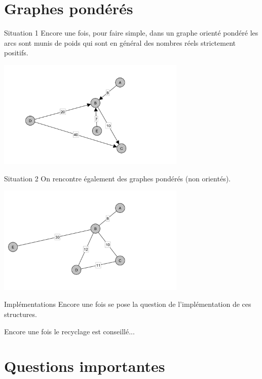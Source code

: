 \documentclass[10pt]{beamer}
\begin{document}
\section{Graphes pondérés}

\begin{frame}{Situation 1}
Encore une fois, pour faire simple, dans un \alert{graphe orienté pondéré} les arcs sont munis de poids qui sont en général des nombres réels strictement positifs.
\begin{center}
\includegraphics[width=9cm]{img/graphpo}
\end{center}
\end{frame}

\begin{frame}{Situation 2}
On rencontre également des \alert{graphes pondérés} (non orientés).
\begin{center}
\includegraphics[width=9cm]{img/graphp}
\end{center}
\end{frame}

\begin{frame}{Implémentations}
Encore une fois se pose la question de l'implémentation de ces structures.\pause

Encore une fois le recyclage est conseillé...
\end{frame}

\section{Questions importantes}
\end{document}
